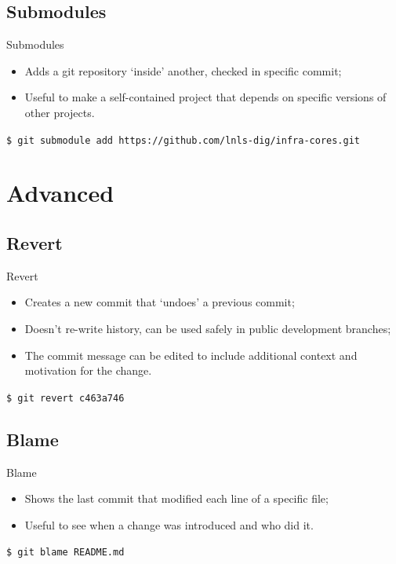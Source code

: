 \documentclass{beamer}
\begin{document}
\subsection{Submodules}
\begin{frame}{Submodules}
  \begin{itemize}
    \item Adds a git repository `inside' another, checked in specific commit;
    \item Useful to make a self-contained project that depends on specific versions of other projects.
  \end{itemize}
  \begin{block}{}
    \texttt{\$ git submodule add https://github.com/lnls-dig/infra-cores.git}
  \end{block}
\end{frame}

\section{Advanced}

\subsection{Revert}
\begin{frame}{Revert}
  \begin{itemize}
    \item Creates a new commit that `undoes' a previous commit;
    \item Doesn't re-write history, can be used safely in public development branches;
    \item The commit message can be edited to include additional context and motivation for the change.
  \end{itemize}
  \begin{block}{}
    \texttt{\$ git revert c463a746}
  \end{block}
\end{frame}

\subsection{Blame}
\begin{frame}{Blame}
  \begin{itemize}
    \item Shows the last commit that modified each line of a specific file;
    \item Useful to see when a change was introduced and who did it.
  \end{itemize}
  \begin{block}{}
    \texttt{\$ git blame README.md}
  \end{block}
\end{frame}
\end{document}
